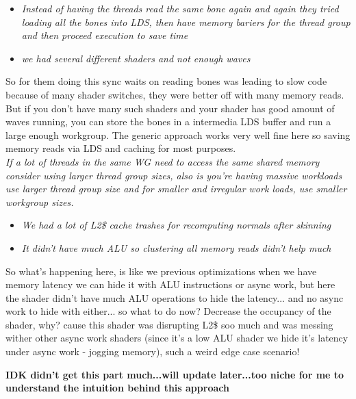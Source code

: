 \documentclass[14pt]{article}
\begin{document}
\begin{itemize}
	\item \textit{Instead of having the threads read the same bone again and again they tried loading  all the bones into LDS, then have memory bariers for the thread group and then proceed execution to save time}
	
	\item \textit{we had several different shaders and not enough waves}
\end{itemize}

So for them doing this sync waits on reading bones was leading to slow code because of many shader switches, they were better off with many memory reads. But if you don't have many such shaders and your shader has good amount of waves running, you can store the bones in a intermedia LDS buffer and run a large enough workgroup. The generic approach works very well fine here so saving memory reads via LDS and caching for most purposes. \\

\textit{If a lot of threads in the same WG need to access the same shared memory consider using larger thread group sizes, also is you're having massive workloads use larger thread group size and for smaller and irregular work loads, use smaller workgroup sizes.} \\


\begin{itemize}
	\item \textit{We had a lot of L2\$ cache trashes for recomputing normals after skinning}
	
	\item \textit{It didn't have much ALU so clustering all memory reads didn't help much}
\end{itemize}

So what's happening here, is like we previous optimizations when we have memory latency we can hide it with ALU instructions or async work, but here the shader didn't have much ALU operations to hide the latency... and no async work to hide with either... so what to do now? Decrease the occupancy of the shader, why? cause this shader was disrupting L2\$ soo much and was messing wither other async work shaders (since it's a low ALU shader we hide it's latency under async work - jogging memory), such a weird edge case scenario!

\textbf{IDK didn't get this part much...will update later...too niche for me to understand the intuition behind this approach}
\end{document}
